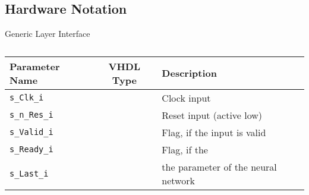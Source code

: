 \subsection{Hardware Notation}


Generic Layer Interface

\begin{table}[h!]
\centering	
\begin{tabular}{l|cl}
	\toprule
	Parameter Name 		   	   & VHDL Type  & Description 								\\
	\midrule
	\texttt{s\_Clk\_i} 	       & \stdlogic  & Clock input								\\
	\texttt{s\_n\_Res\_i} 	   & \stdlogic  & Reset input (active low)					\\
	\texttt{s\_Valid\_i} 	   & \stdlogic  & Flag, if the input is valid				\\
	\texttt{s\_Ready\_i} 	   & \stdlogic  & Flag, if the 								\\
	\texttt{s\_Last\_i} 	   & \stdlogic  & the parameter of the neural network		\\
	\bottomrule
\end{tabular}
\caption{}
\label{tab:hw-layer-interface}
\end{table}

